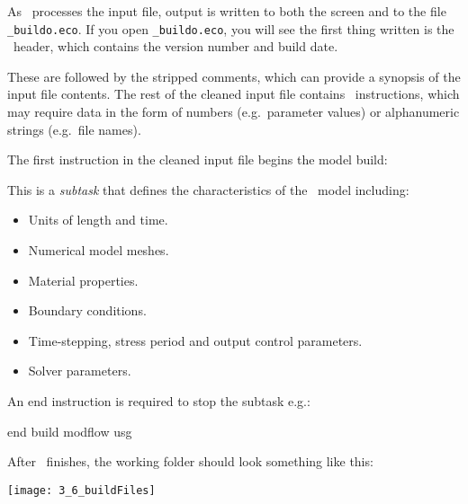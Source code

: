  As \mut\ processes the input file, output is written to both the screen and to the file \texttt{\_buildo.eco}.  If you open \texttt{\_buildo.eco}, you will see the first thing written is the \mut\ header, which contains the version number and build date.

 These are followed by the stripped comments, which  can provide a synopsis of the input file contents. The rest of the cleaned input file contains \mut\ instructions, which may require data in the form of numbers (e.g.\ parameter values) or alphanumeric strings (e.g.\ file names).


The first instruction in the cleaned input file begins the model build:

    {This  is a {\em subtask} that defines the characteristics of the \mfus\ model including:
     \begin{itemize}
        \item Units of length and time.
        \item Numerical model meshes.
        \item Material properties.
        \item Boundary conditions.
        \item Time-stepping, stress period and output control parameters.
        \item Solver parameters.
    \end{itemize}

    An end instruction is required to stop the subtask e.g.:

    {\Large \sf end build modflow usg}
    }

After \mut\ finishes, the working folder should look something like this:

        \texttt{[image: 3\_6\_buildFiles]}

